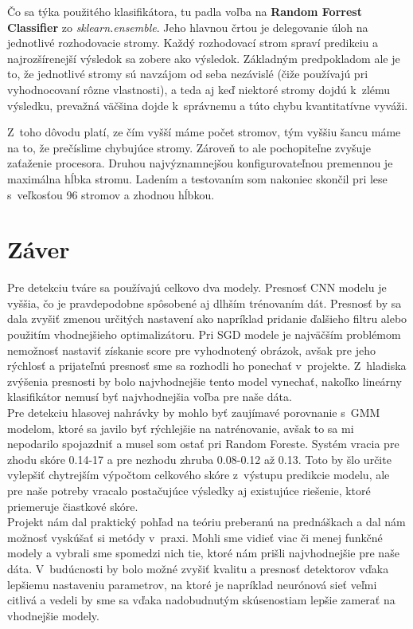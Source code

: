 \documentclass[11pt, a4paper]{article}
\begin{document}
			Čo sa týka použitého klasifikátora, tu padla voľba na \textbf{Random Forrest Classifier} zo \emph{sklearn.ensemble}. Jeho hlavnou črtou je delegovanie úloh na jednotlivé rozhodovacie stromy. Každý rozhodovací strom spraví predikciu a najrozšírenejší výsledok sa zobere ako výsledok. Základným predpokladom ale je to, že jednotlivé stromy sú navzájom od seba nezávislé (čiže používajú pri vyhodnocovaní rôzne vlastnosti), a teda aj keď niektoré stromy dojdú k~zlému výsledku, prevažná väčšina dojde k~správnemu a túto chybu kvantitatívne vyváži.
			
			Z~toho dôvodu platí, ze čím vyšší máme počet stromov, tým vyššiu šancu máme na to, že prečíslime chybujúce stromy. Zároveň to ale pochopiteľne zvyšuje zaťaženie procesora. Druhou najvýznamnejšou konfigurovateľnou premennou je maximálna hĺbka stromu.
			Ladením a testovaním som nakoniec skončil pri lese s~veľkosťou 96 stromov a zhodnou hĺbkou.

\section{Záver}
	Pre detekciu tváre sa používajú celkovo dva modely. Presnosť CNN modelu je vyššia, čo je pravdepodobne spôsobené aj dlhším trénovaním dát. Presnosť by sa dala zvyšiť zmenou určitých nastavení ako napríklad pridanie ďalšieho filtru alebo použitím vhodnejšieho optimalizátoru. Pri SGD modele je najväčším problémom nemožnosť nastaviť získanie score pre vyhodnotený obrázok, avšak pre jeho rýchlosť a prijateľnú presnosť sme sa rozhodli ho ponechať v~projekte. Z~hladiska zvýšenia presnosti by bolo najvhodnejšie tento model vynechať, nakoľko lineárny klasifikátor nemusí byť najvhodnejšia voľba pre naše dáta. 
\\

	Pre detekciu hlasovej nahrávky by mohlo byť zaujímavé porovnanie s~GMM modelom, ktoré sa javilo byť rýchlejšie na natrénovanie, avšak to sa mi nepodarilo spojazdniť a musel som ostať pri Random Foreste. Systém vracia pre zhodu skóre 0.14-17 a pre nezhodu zhruba 0.08-0.12 až 0.13. Toto by šlo určite vylepšiť chytrejším výpočtom celkového skóre z~výstupu predikcie modelu, ale pre naše potreby vracalo postačujúce výsledky aj existujúce riešenie, ktoré priemeruje čiastkové skóre.
	\\
	
	Projekt nám dal praktický pohľad na teóriu preberanú na prednáškach a dal nám možnosť vyskúšať si metódy v~praxi. Mohli sme vidieť viac či menej funkčné modely a vybrali sme spomedzi nich tie, ktoré nám prišli najvhodnejšie pre naše dáta. V~budúcnosti by bolo možné zvyšiť kvalitu a presnosť detektorov vďaka lepšiemu nastaveniu parametrov, na ktoré je napríklad neurónová sieť veľmi citlivá a vedeli by sme sa vďaka nadobudnutým skúsenostiam lepšie zamerať na vhodnejšie modely.
\end{document}
